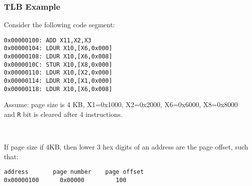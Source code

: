 

\begin{frame}[fragile]\frametitle{TLB Example}
\begin{tcolorbox}[enhanced,attach boxed title to top center={yshift=-3mm,yshifttext=-1mm},
  colback=red!5!white,colframe=red!75!black,colbacktitle=red!80!black,
  title=Try this,fonttitle=\bfseries,
  boxed title style={size=small,colframe=red!50!black} ]
Consider the following code segment:
\begin{verbatim}
0x00000100: ADD X11,X2,X3
0x00000104: LDUR X10,[X6,0x000]
0x00000108: LDUR X10,[X6,0x008]
0x0000010C: STUR X10,[X8,0x000]
0x00000110: LDUR X10,[X2,0x000]
0x00000114: LDUR X10,[X1,0x000]
0x00000118: LDUR X10,[X6,0x008]
\end{verbatim}
Assume: page size is 4 KB, X1=0x1000, X2=0x2000, X6=0x6000, X8=0x8000 and \texttt{R} bit is cleared after 4 instructions.
\end{tcolorbox}\
{\footnotesize
If page size if 4KB, then lower 3 hex digits of an address are the page offset, such that:
\begin{verbatim}
address       page number    page offset
0x00000100      0x00000         100
\end{verbatim}
}
\end{frame}

